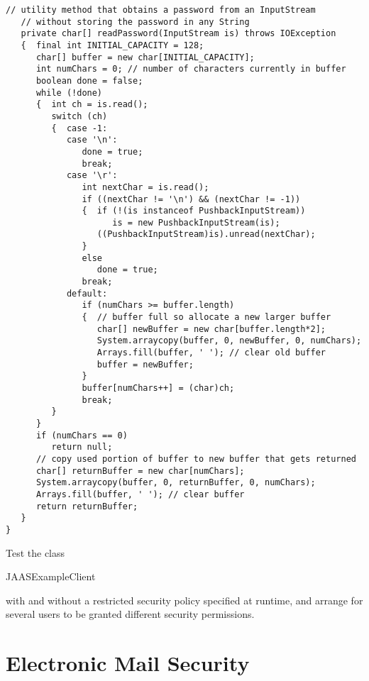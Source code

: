 \begin{lstlisting}[caption=JAAS Callback Handler]
   // utility method that obtains a password from an InputStream
   // without storing the password in any String
   private char[] readPassword(InputStream is) throws IOException
   {  final int INITIAL_CAPACITY = 128;
      char[] buffer = new char[INITIAL_CAPACITY];
      int numChars = 0; // number of characters currently in buffer
      boolean done = false;
      while (!done)
      {  int ch = is.read();
         switch (ch)
         {  case -1:
            case '\n':
               done = true;
               break;
            case '\r':
               int nextChar = is.read();
               if ((nextChar != '\n') && (nextChar != -1))
               {  if (!(is instanceof PushbackInputStream))
                     is = new PushbackInputStream(is);
                  ((PushbackInputStream)is).unread(nextChar);
               }
               else
                  done = true;
               break;
            default:
               if (numChars >= buffer.length)
               {  // buffer full so allocate a new larger buffer
                  char[] newBuffer = new char[buffer.length*2];
                  System.arraycopy(buffer, 0, newBuffer, 0, numChars);
                  Arrays.fill(buffer, ' '); // clear old buffer
                  buffer = newBuffer;
               }
               buffer[numChars++] = (char)ch;
               break;
         }
      }
      if (numChars == 0)
         return null;
      // copy used portion of buffer to new buffer that gets returned
      char[] returnBuffer = new char[numChars];
      System.arraycopy(buffer, 0, returnBuffer, 0, numChars);
      Arrays.fill(buffer, ' '); // clear buffer
      return returnBuffer;
   }
}
\end{lstlisting}


\begin{exercise}
  Test the class \begin{code}JAAS\-ExampleClient\end{code} with and
  without a restricted security policy specified at runtime,
  and arrange for several users to be granted different security permissions.
\end{exercise}



\section{Electronic Mail Security}

